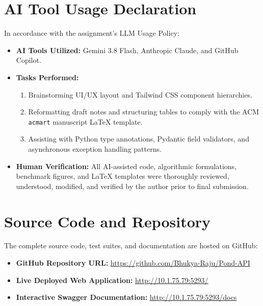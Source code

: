 \documentclass[manuscript,screen,review]{acmart}
\begin{document}
\section{AI Tool Usage Declaration}
\label{sec:ai-usage}
In accordance with the assignment's LLM Usage Policy:
\begin{itemize}
    \item \textbf{AI Tools Utilized:} Gemini 3.8 Flash, Anthropic Claude, and GitHub Copilot.
    \item \textbf{Tasks Performed:}
    \begin{enumerate}
        \item Brainstorming UI/UX layout and Tailwind CSS component hierarchies.
        \item Reformatting draft notes and structuring tables to comply with the ACM \texttt{acmart} manuscript LaTeX template.
        \item Assisting with Python type annotations, Pydantic field validators, and asynchronous exception handling patterns.
    \end{enumerate}
    \item \textbf{Human Verification:} All AI-assisted code, algorithmic formulations, benchmark figures, and LaTeX templates were thoroughly reviewed, understood, modified, and verified by the author prior to final submission.
\end{itemize}

\appendix

\section{Source Code and Repository}
\label{sec:appendix}
The complete source code, test suites, and documentation are hosted on GitHub:
\begin{itemize}
    \item \textbf{GitHub Repository URL:} \url{https://github.com/Bhukya-Raju/Pond-API}
    \item \textbf{Live Deployed Web Application:} \url{http://10.1.75.79:5293/}
    \item \textbf{Interactive Swagger Documentation:} \url{http://10.1.75.79:5293/docs}
\end{itemize}
\end{document}
